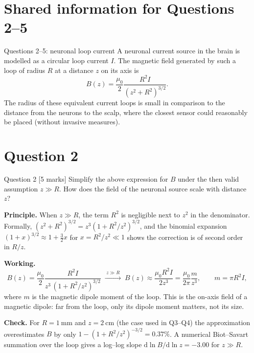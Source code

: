 \documentclass[11pt]{article}
\begin{document}
\section{Shared information for Questions 2--5}

\begin{problembox}{Questions 2--5: neuronal loop current}
A neuronal current source in the brain is modelled as a circular loop current $I$. The magnetic
field generated by such a loop of radius $R$ at a distance $z$ on its axis is
\[ B(z)=\frac{\mu_0}{2}\frac{R^2 I}{(z^2+R^2)^{3/2}} . \]
The radius of these equivalent current loops is small in comparison to the distance from the
neurons to the scalp, where the closest sensor could reasonably be placed (without invasive
measures).
\end{problembox}

\section{Question 2}

\begin{problembox}{Question 2 \hfill [5 marks]}
Simplify the above expression for $B$ under the then valid assumption $z\gg R$. How does the field
of the neuronal source scale with distance $z$?
\end{problembox}

\textbf{Principle.} When $z\gg R$, the term $R^2$ is negligible next to $z^2$ in the denominator.
Formally, $(z^2+R^2)^{3/2} = z^3(1+R^2/z^2)^{3/2}$, and the binomial expansion
$(1+x)^{3/2}\approx 1+\tfrac32 x$ for $x = R^2/z^2 \ll 1$ shows the correction is of second order
in $R/z$.

\textbf{Working.}
\[
B(z) = \frac{\mu_0}{2}\frac{R^2 I}{z^3\,(1+R^2/z^2)^{3/2}}
\;\xrightarrow{\;z\gg R\;}\;
B(z) \approx \frac{\mu_0 R^2 I}{2z^3} = \frac{\mu_0}{2\pi}\frac{m}{z^3},
\qquad m = \pi R^2 I ,
\]
where $m$ is the magnetic dipole moment of the loop. This is the on-axis field of a magnetic
dipole: far from the loop, only its dipole moment matters, not its size.

\textbf{Check.} For $R=\SI{1}{\milli\metre}$ and $z=\SI{2}{\centi\metre}$ (the case used in Q3--Q4)
the approximation overestimates $B$ by only $1-(1+R^2/z^2)^{-3/2} = 0.37\%$. A numerical Biot--Savart
summation over the loop gives a log--log slope $\mathrm{d}\ln B/\mathrm{d}\ln z = -3.00$ for $z\gg R$.
\end{document}
